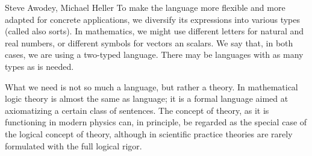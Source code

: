 \begin{artengenv2auth}{Steve Awodey, Michael Heller}
To make the language more flexible and more adapted for concrete applications, we diversify its expressions into various types (called also sorts). In mathematics, we might use different letters for natural and real numbers, or different symbols for vectors an scalars. We say that, in both cases, we are using a two-typed language.  There may be languages with as many types as is needed.

What we need is not so much a language, but rather a theory. In mathematical logic theory is almost the same as language; it is a formal language aimed at axiomatizing a certain class of sentences. The concept of theory, as it is functioning in modern physics can, in principle, be regarded as the special case of the logical concept of theory, although in scientific practice theories are rarely formulated with the full logical rigor.  


\end{artengenv2auth}

